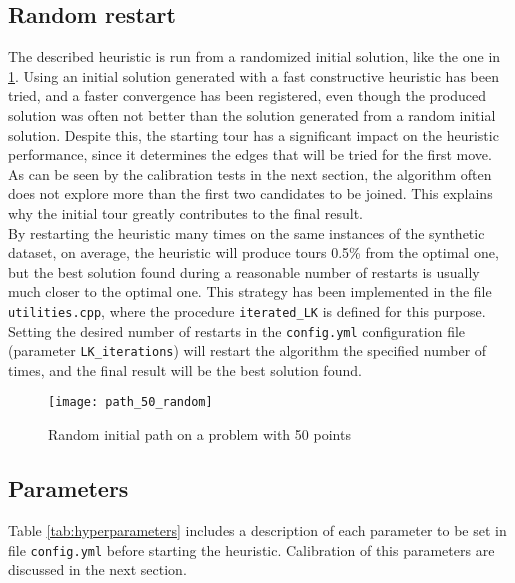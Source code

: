 \subsection{Random restart}
The described heuristic is run from a randomized initial solution, like the one in \cref{fig:randomtour}. Using an initial solution generated with a fast constructive heuristic has been tried, and a faster convergence has been registered, even though the produced solution was often not better than the solution generated from a random initial solution.
Despite this, the starting tour has a significant impact on the heuristic performance, since it determines the edges that will be tried for the first move. As can be seen by the calibration tests in the next section, the algorithm often does not explore more than the first two candidates to be joined. This explains why the initial tour greatly contributes to the final result.\\
By restarting the heuristic many times on the same instances of the synthetic dataset, on average, the heuristic will produce tours 0.5\% from the optimal one, but the best solution found during a reasonable number of restarts is usually much closer to the optimal one. This strategy has been implemented in the file \texttt{utilities.cpp}, where the procedure \texttt{iterated\_LK} is defined for this purpose. Setting the desired number of restarts in the \texttt{config.yml} configuration file (parameter \texttt{LK\_iterations}) will restart the algorithm the specified number of times, and the final result will be the best solution found.

\begin{figure}[h]
	\centering
	\texttt{[image: path\_50\_random]}
	\caption{Random initial path on a problem with 50 points}
	\label{fig:randomtour}
\end{figure}

\clearpage
\subsection{Parameters}
\label{ssec:hyperpar}
Table \ref{tab:hyperparameters} includes a description of each parameter to be set in file \texttt{config.yml} before starting the heuristic. Calibration of this parameters are discussed in the next section.


